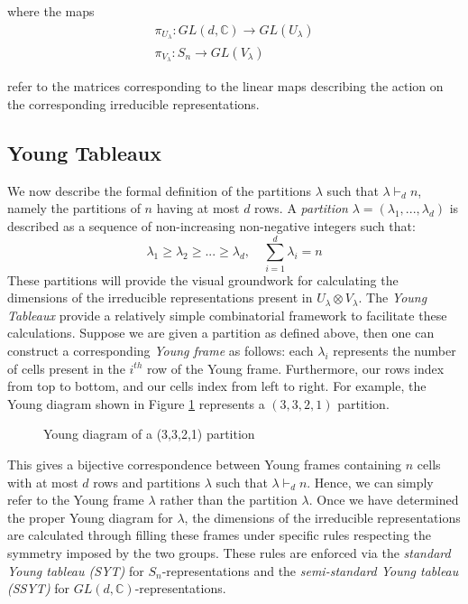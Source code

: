 \documentclass[12pt]{article}%
\begin{document}
\noindent where the maps
\begin{gather*}
  \pi_{U_{\lambda}}: GL(d, \mathbb{C}) \rightarrow GL(U_\lambda) \\ \pi_{V_{\lambda}}: S_n \rightarrow GL(V_\lambda)
\end{gather*}

\noindent refer to the matrices corresponding to the linear maps describing the action on the corresponding irreducible representations.

\subsection{Young Tableaux}
We now describe the formal definition of the partitions $\lambda$ such that $\lambda \vdash_d n$, namely the partitions of $n$ having at most $d$ rows. A \textit{partition} $\lambda = (\lambda_1,...,\lambda_d)$ is described as a sequence of non-increasing non-negative integers such that:
$$ \lambda_1 \geq \lambda_2 \geq ... \geq \lambda_d, \quad \sum_{i=1}^d \lambda_i = n $$
These partitions will provide the visual groundwork for calculating the dimensions of the irreducible representations present in $U_\lambda \otimes V_\lambda$.
The \textit{Young Tableaux} provide a relatively simple combinatorial framework to facilitate these calculations. Suppose we are given a partition as defined above, then one can construct a corresponding \textit{Young frame} as follows: each $\lambda_i$ represents the number of cells present in the $i^{th}$ row of the Young frame. Furthermore, our rows index from top to bottom, and our cells index from left to right. For example, the Young diagram shown in Figure \ref{fig:yd} represents a $(3,3,2,1)$ partition.

\begin{figure}[ht]
    \centering
    \caption{Young diagram of a (3,3,2,1) partition}
    \label{fig:yd}
\end{figure}

\noindent This gives a bijective correspondence between Young frames containing $n$ cells with at most $d$ rows and partitions $\lambda$ such that $\lambda \vdash_d n$. Hence, we can simply refer to the Young frame $\lambda$ rather than the partition $\lambda$.
 Once we have determined the proper Young diagram for $\lambda$, the dimensions of the irreducible representations are calculated through filling these frames under specific rules respecting the symmetry imposed by the two groups. These rules are enforced via the \textit{standard Young tableau (SYT)} for $S_n$-representations and the \textit{semi-standard Young tableau (SSYT)} for $GL(d, \mathbb{C})$-representations.
\end{document}
